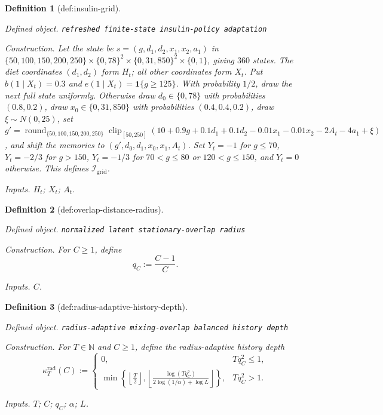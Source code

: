 \documentclass{article}
\newtheorem{definition}{Definition}
\begin{document}
\begin{definition}[def:insulin-grid]\label{def:insulin-grid}
\par\smallskip\noindent\emph{Defined object.} \texttt{refreshed finite-\allowbreak{}state insulin-\allowbreak{}policy adaptation}
\par\smallskip\noindent\emph{Construction.} Let the state be \(s=(g,d_1,d_2,x_1,x_2,a_1)\) in \(\{50,100,150,200,250\}\times\{0,78\}^2\times\{0,31,850\}^2\times\{0,1\}\), giving \(360\) states. The diet coordinates \((d_1,d_2)\) form \(H_t\); all other coordinates form \(X_t\). Put \(b(1\mid X_t)=0.3\) and \(e(1\mid X_t)=\mathbf 1\{g\ge125\}\). With probability \(1/2\), draw the next full state uniformly. Otherwise draw \(d_0\in\{0,78\}\) with probabilities \((0.8,0.2)\), draw \(x_0\in\{0,31,850\}\) with probabilities \((0.4,0.4,0.2)\), draw \(\xi\sim N(0,25)\), set \(g'=\operatorname{round}_{\{50,100,150,200,250\}}\operatorname{clip}_{[50,250]}(10+0.9g+0.1d_1+0.1d_2-0.01x_1-0.01x_2-2A_t-4a_1+\xi)\), and shift the memories to \((g',d_0,d_1,x_0,x_1,A_t)\). Set \(Y_t=-1\) for \(g\le70\), \(Y_t=-2/3\) for \(g>150\), \(Y_t=-1/3\) for \(70<g\le80\) or \(120<g\le150\), and \(Y_t=0\) otherwise. This defines \(\mathcal I_{\mathrm{grid}}\).
\par\smallskip\noindent\emph{Inputs.} \(H_t\); \(X_t\); \(A_t\).
\end{definition}

\begin{definition}[def:overlap-distance-radius]\label{def:overlap-distance-radius}
\par\smallskip\noindent\emph{Defined object.} \texttt{normalized latent stationary-\allowbreak{}overlap radius}
\par\smallskip\noindent\emph{Construction.} For \(C\ge1\), define
\[
 q_C:=\frac{C-1}{C}.
\]
\par\smallskip\noindent\emph{Inputs.} \(C\).
\end{definition}

\begin{definition}[def:radius-adaptive-history-depth]\label{def:radius-adaptive-history-depth}
\par\smallskip\noindent\emph{Defined object.} \texttt{radius-\allowbreak{}adaptive mixing-\allowbreak{}overlap balanced history depth}
\par\smallskip\noindent\emph{Construction.} For \(T\in\mathbb N\) and \(C\ge1\), define the radius-adaptive history depth
\[
 \kappa_T^{\mathrm{rad}}(C):=
 \begin{cases}
 0, & Tq_C^2\le1,\\[3pt]
 \displaystyle
 \min\!\left\{\left\lfloor\frac T2\right\rfloor,
 \left\lfloor\frac{\log(Tq_C^2)}{2\log(1/\alpha)+\log L}\right\rfloor\right\},
 & Tq_C^2>1.
 \end{cases}
\]
\par\smallskip\noindent\emph{Inputs.} \(T\); \(C\); \(q_C\); \(\alpha\); \(L\).
\end{definition}
\end{document}
